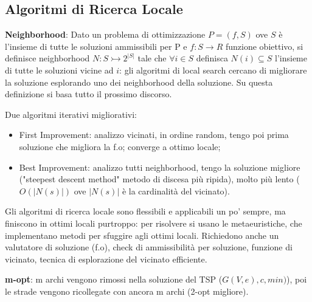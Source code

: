 \subsection{Algoritmi di Ricerca Locale}
\textbf{Neighborhood}: Dato un problema di ottimizzazione $P=(f,S)$ ove $S$ è l'insieme di tutte le soluzioni ammissibili per P e $f:S\rightarrow R$ funzione obiettivo, si definisce neighborhood $N:S\rightarrowtail 2^{|S|}$ tale che $\forall i \in S$ definisca $N(i)\subseteq S$ l'insieme di tutte le soluzioni vicine ad $i$: gli algoritmi di local search cercano di migliorare la soluzione esplorando uno dei neighborhood della soluzione. Su questa definizione si basa tutto il prossimo discorso.

Due algoritmi iterativi migliorativi:
\begin{itemize}
	\item First Improvement: analizzo vicinati, in ordine random, tengo poi prima soluzione che migliora la f.o; converge a ottimo locale;
	\item Best Improvement: analizzo tutti neighborhood, tengo la soluzione migliore ("steepest descent method" metodo di discesa più ripida), molto più lento ($O(|N(s)|)$ ove $|N(s)|$ è la cardinalità del vicinato).
\end{itemize}

Gli algoritmi di ricerca locale sono flessibili e applicabili un po' sempre, ma finiscono in ottimi locali purtroppo: per risolvere si usano le metaeuristiche, che implementano metodi per sfuggire agli ottimi locali. Richiedono anche un valutatore di soluzione (f.o), check di ammissibilità per soluzione, funzione di vicinato, tecnica di esplorazione del vicinato efficiente.

\textbf{m-opt}: m archi vengono rimossi nella soluzione del TSP ($G(V,e),c,min)$), poi le strade vengono ricollegate con ancora m archi (2-opt migliore).